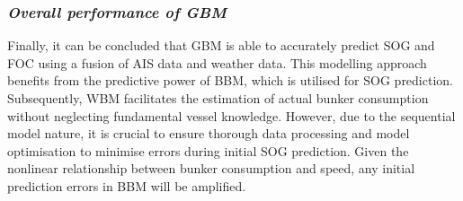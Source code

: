 \subsubsection*{\emph{Overall performance of GBM}}

Finally, it can be concluded that GBM is able to accurately predict SOG and FOC using a fusion of AIS data and weather data. This modelling approach benefits from the predictive power of BBM, which is utilised for SOG prediction. Subsequently, WBM facilitates the estimation of actual bunker consumption without neglecting fundamental vessel knowledge.  However, due to the sequential model nature, it is crucial to ensure thorough data processing and model optimisation to minimise errors during initial SOG prediction. Given the nonlinear relationship between bunker consumption and speed, any initial prediction errors in BBM will be amplified.\\














